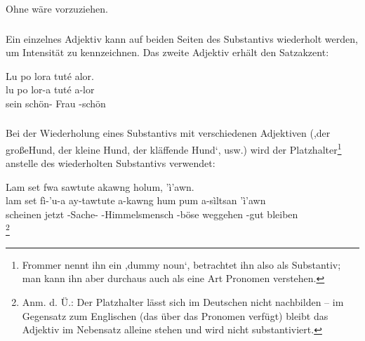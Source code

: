 \noindent Ohne  wäre  vorzuziehen.

\subsubsection{} Ein einzelnes Adjektiv kann auf beiden Seiten des Substantivs wiederholt werden, um Intensität zu kennzeichnen. Das zweite Adjektiv erhält den Satzakzent:

\begin{interlin}
	\glll \Npawl{}Lu po lora tuté alor. \\
	lu po lor-a tuté a-lor \\
	sein  schön- Frau -schön \\
\end{interlin}

\subsubsection{} Bei der Wiederholung eines Substantivs mit verschiedenen Adjektiven (,der große\linebreak Hund, der kleine Hund, der kläffende Hund‘, usw.) wird der Platzhalter\footnote{Frommer nennt ihn ein ,dummy noun‘, betrachtet ihn also als Substantiv; man kann ihn aber durchaus auch als eine Art Pronomen verstehen.}  anstelle des wiederholten Substantivs verwendet:

\begin{interlin}
	\glll \Npawl{}Lam set fwa sawtute akawng holum,   'ì'awn. \\
	lam set fì-'u-a ay-tawtute a-kawng hum pum a-sìltsan 'ì'awn \\
	scheinen jetzt -Sache- -Himmelsmensch -böse weggehen  -gut bleiben \\
	\footnote{Anm. d. Ü.: Der Platzhalter lässt sich im Deutschen nicht nachbilden -- im Gegensatz zum Englischen (das über das Pronomen  verfügt) bleibt das Adjektiv im Nebensatz alleine stehen und wird nicht substantiviert.}
\end{interlin}

